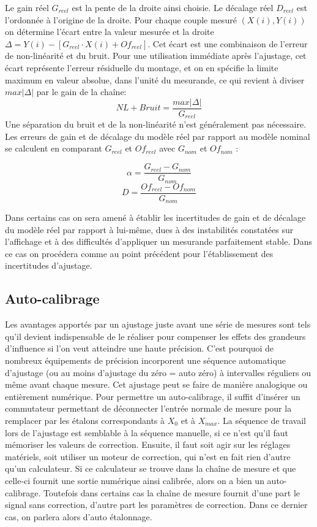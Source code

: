 \documentclass[main.tex]{subfiles}
\begin{document}
Le gain réel $G_{reel}$ est la pente de la droite ainsi choisie. Le décalage réel $D_{reel}$ est l'ordonnée à l'origine de la droite. Pour chaque couple mesuré $(X(i),Y(i))$ on détermine l'écart entre la valeur mesurée et la droite $\Delta = Y(i) - [G_{reel}\cdot X(i) + Of_{reel}]$. Cet écart est une combinaison de l'erreur de non-linéarité et du bruit. Pour une utilisation immédiate après l'ajustage, cet écart représente l'erreur résiduelle du montage, et on en spécifie la limite maximum en valeur absolue, dans l'unité du mesurande, ce qui revient à diviser $max{|\Delta|}$ par le gain de la chaîne:
\[
    NL+Bruit = \frac{max{|\Delta|}}{G_{reel}}
\]
Une séparation du bruit et de la non-linéarité n'est généralement pas nécessaire.
Les erreurs de gain et de décalage du modèle réel par rapport au modèle nominal se calculent en comparant $G_{reel}$ et $Of_{reel}$ avec $G_{nom}$ et $Of_{nom}$ :

\[\alpha =  \frac{G_{reel}-G_{nom}}{G_{nom}}	 \]
\[D =  \frac{Of_{reel}-Of_{nom}}{G_{nom}} \]

Dans certains cas on sera amené à établir les incertitudes de gain et de décalage du modèle réel par rapport à lui-même, dues à des instabilités constatées sur l'affichage et à des difficultés d'appliquer un mesurande parfaitement stable. Dans ce cas on procédera comme au point précédent pour l'établissement des incertitudes d'ajustage.

\subsection{Auto-calibrage }
Les avantages apportés par un ajustage juste avant une série de mesures sont tels qu'il devient indispensable de le réaliser pour compenser les effets des grandeurs d'influence si l'on veut atteindre une haute précision. C'est pourquoi de nombreux équipements de précision incorporent une séquence automatique d'ajustage (ou au moins d'ajustage du zéro = auto zéro) à intervalles réguliers ou même avant chaque mesure. Cet ajustage peut se faire de manière analogique ou entièrement numérique.
Pour permettre un auto-calibrage, il suffit d'insérer un commutateur permettant de déconnecter l'entrée normale de mesure pour la remplacer par les étalons correspondants à $X_0$ et à $X_{max}$. La séquence de travail lors de l'ajustage est semblable à la séquence manuelle, si ce n'est qu'il faut mémoriser les valeurs de correction. Ensuite, il faut soit agir sur les réglages matériels, soit utiliser un moteur de correction, qui n'est en fait rien d'autre qu'un calculateur. Si ce calculateur se trouve dans la chaîne de mesure et que celle-ci fournit une sortie numérique ainsi calibrée, alors on a bien un auto-calibrage. Toutefois dans certains cas la chaîne de mesure fournit d'une part le signal sans correction, d'autre part les paramètres de correction. Dans ce dernier cas, on parlera alors d'auto étalonnage.
\end{document}
